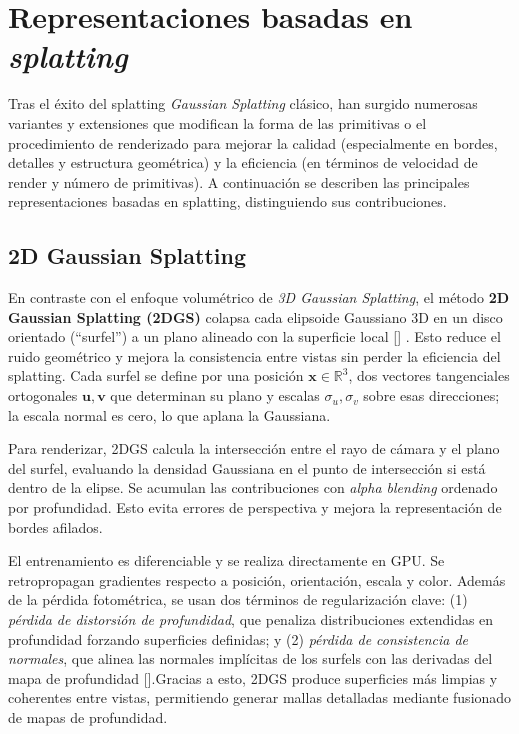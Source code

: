 \section{Representaciones basadas en \textit{splatting}}

Tras el éxito del splatting \textit{Gaussian Splatting} clásico, han surgido numerosas variantes y extensiones que modifican la forma de las primitivas o el procedimiento de renderizado para mejorar la calidad (especialmente en bordes, detalles y estructura geométrica) y la eficiencia (en términos de velocidad de render y número de primitivas). A continuación se describen las principales representaciones basadas en splatting, distinguiendo sus contribuciones.

\subsection{2D Gaussian Splatting}  

En contraste con el enfoque volumétrico de \textit{3D Gaussian Splatting}, el método \textbf{2D Gaussian Splatting (2DGS)} colapsa cada elipsoide Gaussiano 3D en un disco orientado (“surfel”) a un plano alineado con la superficie local [\cite{Huang_2024}] . Esto reduce el ruido geométrico y mejora la consistencia entre vistas sin perder la eficiencia del splatting. Cada surfel se define por una posición $\mathbf{x} \in \mathbb{R}^3$, dos vectores tangenciales ortogonales $\mathbf{u}, \mathbf{v}$ que determinan su plano y escalas $\sigma_u, \sigma_v$ sobre esas direcciones; la escala normal es cero, lo que aplana la Gaussiana.  


Para renderizar, 2DGS calcula la intersección entre el rayo de cámara y el plano del surfel, evaluando la densidad Gaussiana en el punto de intersección si está dentro de la elipse. Se acumulan las contribuciones con \textit{alpha blending} ordenado por profundidad. Esto evita errores de perspectiva y mejora la representación de bordes afilados.

El entrenamiento es diferenciable y se realiza directamente en GPU. Se retropropagan gradientes respecto a posición, orientación, escala y color. Además de la pérdida fotométrica, se usan dos términos de regularización clave: (1) \textit{pérdida de distorsión de profundidad}, que penaliza distribuciones extendidas en profundidad forzando superficies definidas; y (2) \textit{pérdida de consistencia de normales}, que alinea las normales implícitas de los surfels con las derivadas del mapa de profundidad [\cite{Huang_2024}].Gracias a esto, 2DGS produce superficies más limpias y coherentes entre vistas, permitiendo generar mallas detalladas mediante fusionado de mapas de profundidad. 

